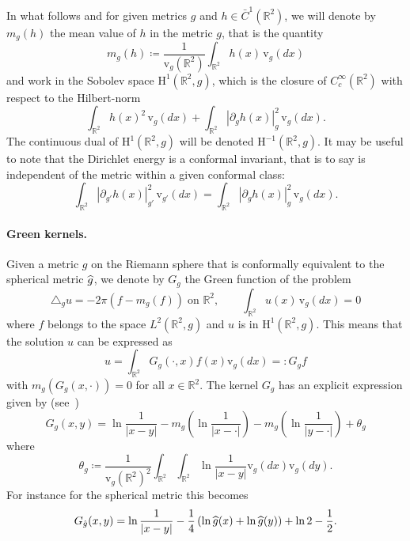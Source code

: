 \documentclass[AHL,Unicode,longabstracts,published]{cedram}
\newcommand{\rmv}{\mathrm{v}}
\newcommand{\rmH}{\mathrm{H}}
\newcommand{\R}{\mathbb{R}}
\newcommand{\norm}[1]{\left\lvert#1\right\rvert}
\let\oldhat\hat
\renewcommand*{\hat}[1]{\mathchoice{\widehat{#1}}{\widehat{#1}}{\oldhat{#1}}{\oldhat{#1}}}
\begin{document}
In what follows and for given metrics $g$ and $h\in \bar C^1(\R^2)$, we will denote by $m_{g}(h)$ the mean value of $h$ in the metric $g$, that is the quantity
\begin{equation}
m_{g}(h)\coloneqq \frac{1}{\rmv_g\left(\R^2\right)}\int_{\R^2}h(x)\,\rmv_g (dx)
\end{equation}
and work in the Sobolev space $\rmH^1(\R^2,g)$, which is the closure of $C^\infty_c(\R^2)$ with respect to the Hilbert-norm
\begin{equation}\label{Hnorm}
\int_{\R^2}h(x)^2\,\rmv_{g}(dx)+\int_{\R^2}\left|\partial_g h(x)\right|^2_g\,\rmv_g(dx).
\end{equation}
The continuous dual of $\rmH^1(\R^2,g)$ will be denoted $\rmH^{-1}(\R^2,g)$. It may be useful to note that the Dirichlet energy is a conformal invariant, that is to say is independent of the metric within a given conformal class:
\begin{equation}\label{diri}
\int_{\R^2}\left|\partial_{g'} h(x)\right|_{g'}^2\, \rmv_{g'}(dx)=\int_{\R^2}\left|\partial_{g} h(x)\right|_{g}^2\,\rmv_{g}(dx).
\end{equation}


\paragraph{Green kernels.} Given a metric $g$ on the Riemann sphere that is conformally equivalent to the spherical metric $\hat g$, we denote by $G_g$ the Green function of the problem
\begin{equation*}
\triangle_g u=-2\pi \left(f-m_g(f)\right) \;\text{on }\R^2,\qquad \int_{\R^2} u(x) \,\rmv_g(dx) =0
\end{equation*}
where $f$ belongs to the space $L^2(\R^2, g)$ and $u$ is in $ \rmH^1(\R^2,g)$. This means that the solution $u$ can be expressed as
\begin{equation}
u=\int_{\R^2} G_g(\cdot,x)f(x)\rmv_g(dx)=:G_gf
\end{equation}
with $m_g(G_g(x,\cdot))=0$ for all $x\in\R^2$. The kernel $G_g$ has an explicit expression given by (see~\cite[Equation~(2.9)]{DKRV})
\begin{equation}
G_g(x,y)=\ln\frac{1}{\norm{x-y}}-m_g\left(\ln\frac{1}{\norm{x-\cdot}}\right)-m_g\left(\ln\frac{1}{\norm{y-\cdot}}\right)+\theta_g
\end{equation}
where
\[
\theta_g\coloneqq \frac{1}{\rmv_g(\R^2)^2}\int_{\R^2}\int_{\R^2}\ln\frac{1}{\norm{x-y}}\rmv_g(dx)\rmv_g(dy).
\]
For instance for the spherical metric this becomes
\begin{equation}\label{Green_round}
G_{\hat g}(x,y)=\ln\frac{1}{\norm{x-y}}-\frac14\left(\ln\hat g(x)+\ln\hat g(y)\right)+\ln 2-\frac12.
\end{equation}
\end{document}
